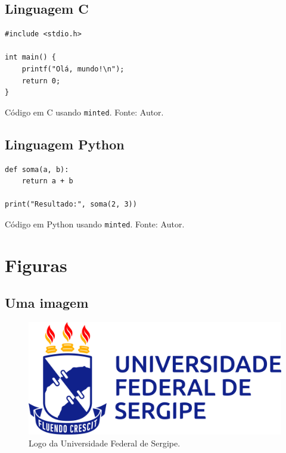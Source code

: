 \subsection{Linguagem C}

\begin{codigo}[H]
\begin{verbatim}
#include <stdio.h>

int main() {
    printf("Olá, mundo!\n");
    return 0;
}
\end{verbatim}
\caption{Código em C usando \texttt{minted}. Fonte: Autor.}
\label{cod:c}
\end{codigo}

\subsection{Linguagem Python}

\begin{codigo}[H]
\begin{verbatim}
def soma(a, b):
    return a + b

print("Resultado:", soma(2, 3))
\end{verbatim}
\caption{Código em Python usando \texttt{minted}. Fonte: Autor.}
\label{cod:python}
\end{codigo}





\section{Figuras}


\subsection{Uma imagem}

\begin{figure}[H]
	\centering
	\includegraphics[width=0.3\linewidth]{Imagens/ufs_horizontal_positiva.png}
	\caption{Logo da Universidade Federal de Sergipe.}
	\label{fig:logo_ufs}
\end{figure}

